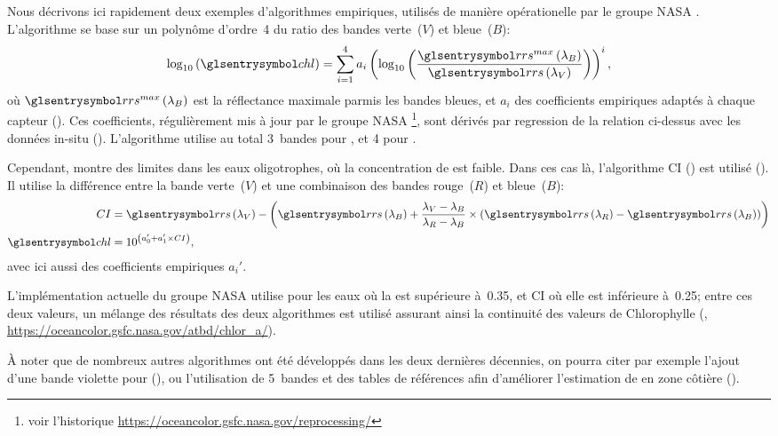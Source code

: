 \begin{technique}
Nous décrivons ici rapidement deux exemples d'algorithmes empiriques, utilisés de manière opérationelle par le groupe NASA .
L'algorithme  se base sur un polynôme d'ordre~4 du ratio des bandes verte~(\(V\)) et bleue~(\(B\)):
\begin{equation} \label{eq:ocx}
  \log_{10}\paren{\am{chl}} =
  \sum_{i=1}^{4} a_i \paren{\log_{10}\paren{
      \frac{ \am{rrs}^{max}\paren{\lambda_B} }
           { \am{rrs}\paren{\lambda_V} }
    }}^i ,
\end{equation}
où \(\am{rrs}^{max}\paren{\lambda_B}\) est la réflectance maximale parmis les bandes bleues, et \(a_i\) des coefficients empiriques adaptés à chaque capteur (\cite{oreilly_1998,oreilly_2000}).
Ces coefficients, régulièrement mis à jour par le groupe NASA \footnote{voir l'historique \url{https://oceancolor.gsfc.nasa.gov/reprocessing/}}, sont dérivés par regression de la relation ci-dessus avec les données in-situ  (\cite{werdell_2005}).
L'algorithme utilise au total 3~bandes pour , et 4 pour .

Cependant,  montre des limites dans les eaux oligotrophes, où la concentration de  est faible.
Dans ces cas là, l'algorithme CI () est utilisé (\cite{hu_2012}).
Il utilise la différence entre la bande verte~(\(V\)) et une combinaison des bandes rouge~(\(R\)) et bleue~(\(B\)):
\begin{equation}
  \label{eq:CI}
  \begin{split}
    CI &= \am{rrs}\paren{\lambda_V} -
         \paren{
          \am{rrs}\paren{\lambda_B}
          + \frac {\lambda_V - \lambda_B}
                  {\lambda_R - \lambda_B}
          \times \paren{\am{rrs}\paren{\lambda_R}
                      - \am{rrs}\paren{\lambda_B}}
         }
    \\
    \am{chl} &= 10^{\paren{a_0' + a_1' \times CI}},
  \end{split}
\end{equation}
avec ici aussi des coefficients empiriques \(a_i'\).

L'implémentation actuelle du groupe NASA  utilise  pour les eaux où la  est supérieure à~\qty{0.35}{\mgm}, et CI où elle est inférieure à~\qty{0.25}{\mgm}; entre ces deux valeurs, un mélange des résultats des deux algorithmes est utilisé assurant ainsi la continuité des valeurs de Chlorophylle (\cite{oreilly_2019}, \url{https://oceancolor.gsfc.nasa.gov/atbd/chlor_a/}).

À noter que de nombreux autres algorithmes ont été développés dans les deux dernières décennies, on pourra citer par exemple l'ajout d'une bande violette pour  (\cite{oreilly_2019}), ou l'utilisation de 5~bandes et des tables de références afin d'améliorer l'estimation de  en zone côtière (\cite{gohin_2002}).
\end{technique}

